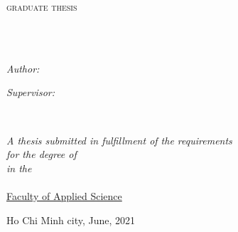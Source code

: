 \begin{titlepage}
    \begin{center}
    
    \vspace*{.06\textheight}
    {\scshape\LARGE \univname\par}\vspace{1.5cm} %
    \textsc{\Large graduate thesis}\\[0.5cm] %
    
    \HRule \\[0.4cm] %
    {\huge \bfseries \ttitle\par}\vspace{0.4cm} %
    \HRule \\[1.5cm] %
     
    \begin{minipage}[t]{0.4\textwidth}
        \begin{flushleft} \large
        \emph{Author:}\\
        \href{http://www.johnsmith.com}{\authorname} %
        \end{flushleft}
        \end{minipage}
        \begin{minipage}[t]{0.4\textwidth}
        \begin{flushright} \large
        \emph{Supervisor:} \\
        \href{https://www.facebook.com/thanhnhanguyen}{\supname} %
        \end{flushright}
    \end{minipage}\\[3cm]
     
    \vfill
    
    \large \textit{A thesis submitted in fulfillment of the requirements\\ for the degree of \degreename}\\[0.2cm] %
    \textit{in the}\\[0.3cm]
    \deptname\\
    \href{http://www.aao.hcmut.edu.vn/index.php?route=catalog/nganh&hedaotao_id=9&khoa_id=18}{Faculty of Applied Science}\\[2cm]%
     
    \vfill
    
    {Ho Chi Minh city, June, 2021}
     
    \vfill
    \end{center}
\end{titlepage}